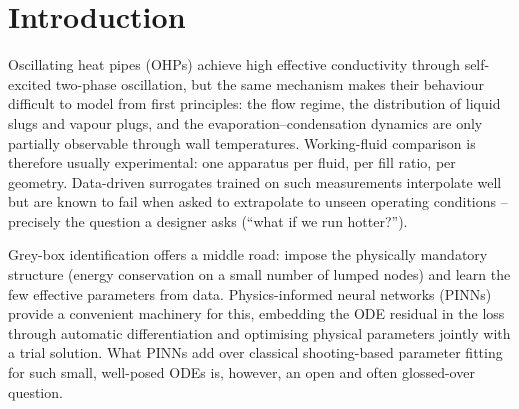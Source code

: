 \section{Introduction}
Oscillating heat pipes (OHPs) achieve high effective conductivity through self-excited two-phase oscillation, but the
same mechanism makes their behaviour difficult to model from first principles: the flow regime, the distribution of
liquid slugs and vapour plugs, and the evaporation--condensation dynamics are only partially observable through wall
temperatures. Working-fluid comparison is therefore usually experimental: one apparatus per fluid, per fill ratio, per
geometry. Data-driven surrogates trained on such measurements interpolate well but are known to fail when asked to
extrapolate to unseen operating conditions -- precisely the question a designer asks (``what if we run hotter?'').

Grey-box identification offers a middle road: impose the physically mandatory structure (energy conservation on a
small number of lumped nodes) and learn the few effective parameters from data. Physics-informed neural networks
(PINNs) provide a convenient machinery for this, embedding the ODE residual in the loss through automatic
differentiation and optimising physical parameters jointly with a trial solution. What PINNs add over classical
shooting-based parameter fitting for such small, well-posed ODEs is, however, an open and often glossed-over question.


